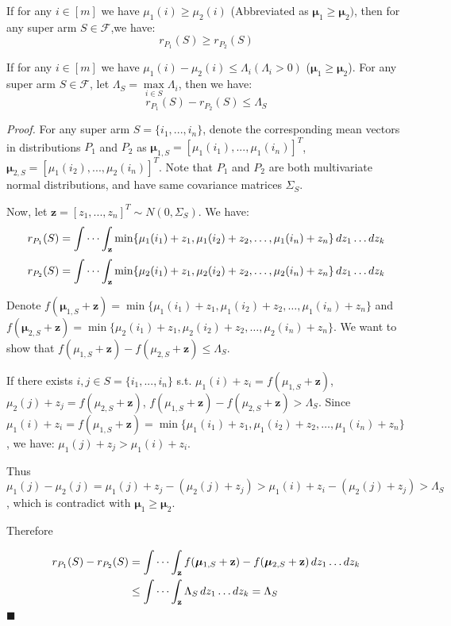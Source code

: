 \documentclass[opre,sglanonrev]{informs4}
\begin{document}
\begin{appendices}
\begin{lemma}
If for any $i \in [m]$ we have $\mu_1(i) \geq \mu_2(i)$ (Abbreviated as $\boldsymbol{\mu}_1 \geq \boldsymbol{\mu}_2)$, then for any super arm $S \in \mathcal{F}$,we have:
$$
r_{P_1}(S) \geq r_{P_2}(S)
$$	
\end{lemma}

\begin{lemma}
If for any $i \in [m]$ we have $\mu_1(i) - \mu_2(i) \leq \Lambda_i (\Lambda_i>0)$ ($\boldsymbol{\mu}_1 \geq \boldsymbol{\mu}_2$). For any super arm $S \in \mathcal{F}$, let $\Lambda_S = \mathop{\max}\limits_{i\in S}\Lambda_i$, then we have:
$$
r_{P_1}(S) - r_{P_2}(S) \leq \Lambda_S
$$
\end{lemma}
\textit{Proof.} For any super arm $S = \{i_1,...,i_n\}$, denote the corresponding mean vectors in distributions $P_1$ and $P_2$ as $\boldsymbol{\mu}_{1,S} = [\mu_1(i_1),...,\mu_1(i_n)]^T$, $\boldsymbol{\mu}_{2,S} = [\mu_1(i_2),...,\mu_2(i_n)]^T$. Note that $P_1$ and $P_2$ are both multivariate normal distributions, and have same covariance matrices $\Sigma_S$.

Now, let $\mathbf{z} = [z_1,...,z_n]^T \sim N(0,\Sigma_S)$. We have:
$$
r_{P_1}(S) = \idotsint_\mathbf{z} \min \{\mu_1(i_1)+z_1,\mu_1(i_2)+z_2, \dots ,\mu_1(i_n)+z_n\} \,dz_1 \dots dz_k
$$
$$
r_{P_2}(S) = \idotsint_\mathbf{z} \min \{\mu_2(i_1)+z_1,\mu_2(i_2)+z_2, \dots ,\mu_2(i_n)+z_n\} \,dz_1 \dots dz_k
$$

Denote $f(\boldsymbol{\mu}_{1,S}+\mathbf{z}) = \min \{\mu_1(i_1)+z_1,\mu_1(i_2)+z_2, \dots ,\mu_1(i_n)+z_n\}$ and $f(\boldsymbol{\mu}_{2,S}+\mathbf{z}) = \min \{\mu_2(i_1)+z_1,\mu_2(i_2)+z_2, \dots ,\mu_2(i_n)+z_n\}$. We want to show that $f(\mu_{1,S}+\mathbf{z})-f(\mu_{2,S}+\mathbf{z})\leq \Lambda_S$.

If there exists $i,j\in S=\{i_1,...,i_n\}$ s.t. $\mu_1(i)+z_i = f(\mu_{1,S}+\mathbf{z})$, $\mu_2(j)+z_j = f(\mu_{2,S}+\mathbf{z})$, $f(\mu_{1,S}+\mathbf{z})-f(\mu_{2,S}+\mathbf{z})>\Lambda_S$. Since $\mu_1(i)+z_i = f(\mu_{1,S}+\mathbf{z}) = \min \{\mu_1(i_1)+z_1,\mu_1(i_2)+z_2, \dots ,\mu_1(i_n)+z_n\}$, we have: $\mu_1(j)+z_j> \mu_1(i)+z_i$.

Thus $\mu_1(j)-\mu_2(j) = \mu_1(j)+z_j-(\mu_2(j)+z_j)>\mu_1(i)+z_i-(\mu_2(j)+z_j)>\Lambda_S$, which is contradict with $\boldsymbol{\mu}_1 \geq \boldsymbol{\mu}_2$.

Therefore

$$
\begin{aligned}
r_{P_1}(S)-r_{P_2}(S) &= \idotsint_\mathbf{z} f(\boldsymbol{\mu}_{1,S}+\mathbf{z})-f(\boldsymbol{\mu}_{2,S}+\mathbf{z}) \,dz_1 \dots dz_k\\
&\leq \idotsint_\mathbf{z} \Lambda_S \,dz_1 \dots dz_k = \Lambda_S 
\end{aligned}
$$
\hfill $\blacksquare$


\end{appendices}
\end{document}
